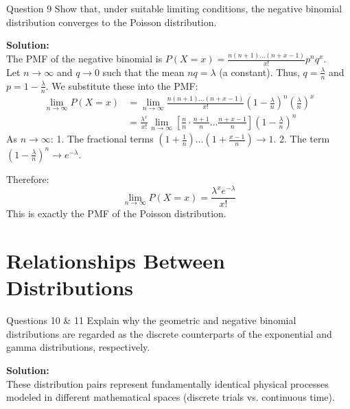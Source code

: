 \documentclass[11pt, a4paper]{article}
\begin{document}
\vspace{0.5cm}
\begin{problem}{Question 9}
Show that, under suitable limiting conditions, the negative binomial distribution converges to the Poisson distribution.
\end{problem}

\noindent\textbf{Solution:} \\
The PMF of the negative binomial is $P(X=x) = \frac{n(n+1)\dots(n+x-1)}{x!} p^n q^x$. \\
Let $n \to \infty$ and $q \to 0$ such that the mean $nq = \lambda$ (a constant). Thus, $q = \frac{\lambda}{n}$ and $p = 1 - \frac{\lambda}{n}$. 
We substitute these into the PMF:
\begin{align*}
    \lim_{n \to \infty} P(X=x) &= \lim_{n \to \infty} \frac{n(n+1)\dots(n+x-1)}{x!} \left(1 - \frac{\lambda}{n}\right)^n \left(\frac{\lambda}{n}\right)^x \\
    &= \frac{\lambda^x}{x!} \lim_{n \to \infty} \left[ \frac{n}{n} \cdot \frac{n+1}{n} \dots \frac{n+x-1}{n} \right] \left(1 - \frac{\lambda}{n}\right)^n
\end{align*}
As $n \to \infty$:
1. The fractional terms $\left(1 + \frac{1}{n}\right) \dots \left(1 + \frac{x-1}{n}\right) \to 1$.
2. The term $\left(1 - \frac{\lambda}{n}\right)^n \to e^{-\lambda}$.

Therefore:
\[ \lim_{n \to \infty} P(X=x) = \frac{\lambda^x e^{-\lambda}}{x!} \]
This is exactly the PMF of the Poisson distribution.

\clearpage
\section{Relationships Between Distributions}

\begin{problem}{Questions 10 \& 11}
Explain why the geometric and negative binomial distributions are regarded as the discrete counterparts of the exponential and gamma distributions, respectively.
\end{problem}

\noindent\textbf{Solution:} \\
These distribution pairs represent fundamentally identical physical processes modeled in different mathematical spaces (discrete trials vs. continuous time).
\end{document}
